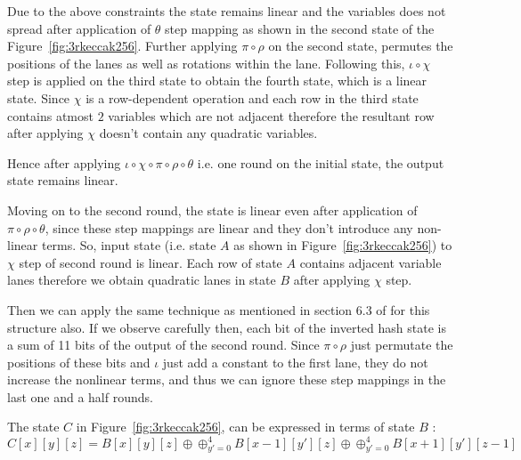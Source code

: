 Due to the above constraints the state remains linear and the variables does not spread after application of $\theta$ step mapping as shown in the second state of the Figure~\ref{fig:3rkeccak256}. Further applying $\pi \circ \rho$ on the second state, permutes the positions of the lanes as well as rotations within the lane. Following this, $\iota \circ \chi$ step is applied on the third state to obtain the fourth state, which is a linear state. Since $\chi$ is a row-dependent operation and each row in the third state contains atmost $2$ variables which are not adjacent therefore the resultant row after applying $\chi$ doesn't contain any quadratic variables. 

Hence after applying $\iota \circ \chi \circ \pi \circ \rho \circ \theta $ i.e. one round on the initial state, the output state remains linear.

Moving on to the second round, the state is linear even after application of $\pi \circ \rho \circ \theta$, since these step mappings are linear and they don't introduce any non-linear terms. So, input state (i.e. state $A$ as shown in Figure~\ref{fig:3rkeccak256}) to $\chi$ step of second round is linear. Each row of state $A$ contains adjacent variable lanes therefore we obtain quadratic lanes in state $B$ after applying $\chi$ step.


Then we can apply the same technique as mentioned in section 6.3 of \cite{guo2016linear} for this structure also. If we observe carefully then, each bit of the inverted hash state is a sum of 11 bits of the output of the second round. Since $\pi \circ \rho$ just permutate the positions of these bits and $\iota$ just add a constant to the first lane, they do not increase the nonlinear terms, and thus we can ignore these step mappings in the last one and a half rounds. 

The state $C$ in Figure~\ref{fig:3rkeccak256}, can be expressed in terms of state $B$ :
\[
    C[x][y][z] = B[x][y][z] \oplus \oplus_{y' = 0}^{4} B[x-1][y'][z] \oplus \oplus_{y' = 0}^{4} B[x+1][y'][z-1]
\]

